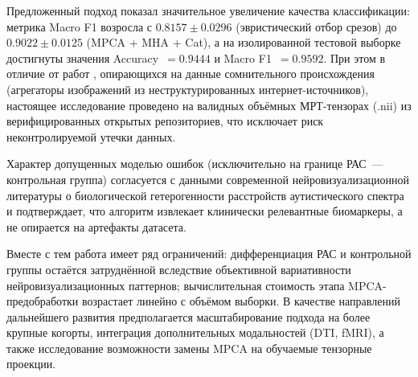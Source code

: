 \documentclass[eqsecnum, authorsinfo]{kioj6}
\begin{document}
Предложенный подход показал значительное увеличение качества классификации: метрика Macro F1 возросла с $0.8157 \pm 0.0296$ (эвристический отбор срезов) до $0.9022 \pm 0.0125$ (MPCA + MHA + Cat), а на изолированной тестовой выборке достигнуты значения Accuracy~$= 0.9444$ и Macro F1~$= 0.9592$. При этом в отличие от работ \cite{1,3,4}, опирающихся на данные сомнительного происхождения (агрегаторы изображений из неструктурированных интернет-источников), настоящее исследование проведено на валидных объёмных МРТ-тензорах (.nii) из верифицированных открытых репозиториев, что исключает риск неконтролируемой утечки данных.

Характер допущенных моделью ошибок (исключительно на границе РАС~--- контрольная группа) согласуется с данными современной нейровизуализационной литературы \cite{7} о биологической гетерогенности расстройств аутистического спектра и подтверждает, что алгоритм извлекает клинически релевантные биомаркеры, а не опирается на артефакты датасета.

Вместе с тем работа имеет ряд ограничений: дифференциация РАС и контрольной группы остаётся затруднённой вследствие объективной вариативности нейровизуализационных паттернов; вычислительная стоимость этапа MPCA-предобработки возрастает линейно с объёмом выборки. В качестве направлений дальнейшего развития предполагается масштабирование подхода на более крупные когорты, интеграция дополнительных модальностей (DTI, fMRI), а также исследование возможности замены MPCA на обучаемые тензорные проекции.






\printauthorsinfo
\end{document}
